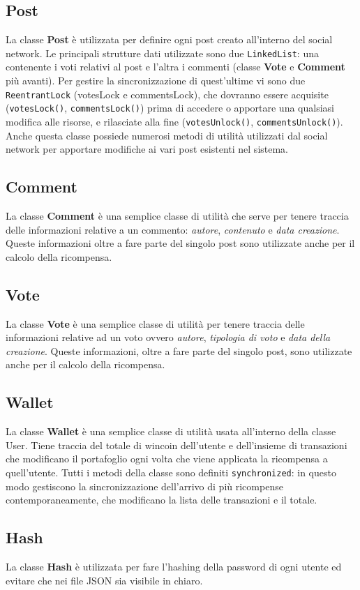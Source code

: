 \documentclass[11pt, a4paper, oneside]{article}
\begin{document}
\subsection{Post}
La classe \textbf{Post} è utilizzata per definire ogni post creato all'interno del social network. Le principali strutture dati utilizzate sono due \texttt{LinkedList}: 
una contenente i voti relativi al post e l'altra i commenti (classe \textbf{Vote} e \textbf{Comment} più avanti). Per gestire la sincronizzazione di quest'ultime
vi sono due \texttt{ReentrantLock} (votesLock e commentsLock), che dovranno essere 
acquisite (\texttt{votesLock()}, \texttt{commentsLock()}) prima di accedere o apportare una qualsiasi modifica alle risorse, e rilasciate alla fine (\texttt{votesUnlock()}, \texttt{commentsUnlock()}). 
Anche questa classe possiede numerosi metodi di utilità utilizzati dal social network per apportare modifiche ai vari post esistenti nel sistema. 
\subsection{Comment}
La classe \textbf{Comment} è una semplice classe di utilità che serve per tenere traccia delle informazioni relative a un commento: \textit{autore}, \textit{contenuto} e \textit{data creazione}.
Queste informazioni oltre a fare parte del singolo post sono utilizzate anche per il calcolo della ricompensa.
\subsection{Vote}
La classe \textbf{Vote} è una semplice classe di utilità per tenere traccia delle informazioni relative ad un voto ovvero \textit{autore}, \textit{tipologia di voto} e \textit{data della creazione}.
Queste informazioni, oltre a fare parte del singolo post, sono utilizzate anche per il calcolo della ricompensa.
\subsection{Wallet}
La classe \textbf{Wallet} è una semplice classe di utilità usata all'interno della classe User. Tiene traccia del totale di wincoin dell'utente e dell'insieme di transazioni
che modificano il portafoglio ogni volta che viene applicata la ricompensa a quell'utente. Tutti i metodi della classe sono definiti \texttt{synchronized}: in questo modo gestiscono la 
sincronizzazione dell'arrivo di più ricompense contemporaneamente, che modificano la lista delle transazioni e il totale.
\subsection{Hash}
La classe \textbf{Hash} è utilizzata per fare l'hashing della password di ogni utente ed evitare che nei file JSON sia visibile in chiaro.
\end{document}
